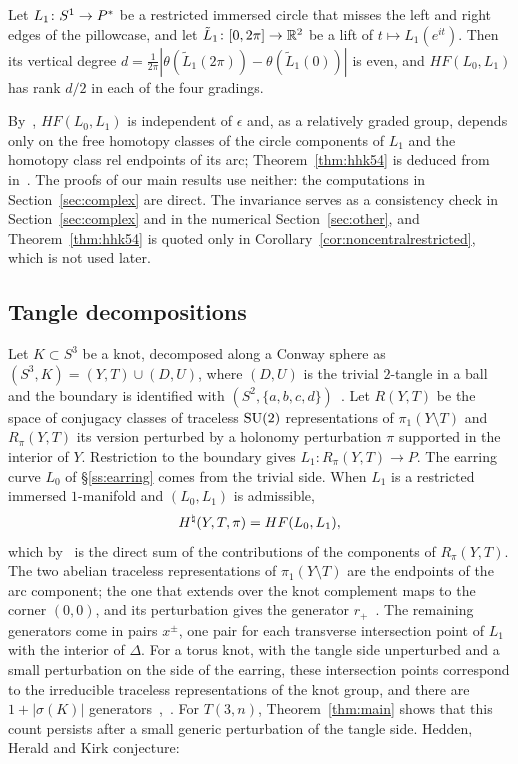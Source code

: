 \begin{theorem}\label{thm:hhk54}
Let $L_1\colon S^1\to P^{*}$ be a restricted immersed circle that misses the left and right edges of the
pillowcase, and let $\tilde L_1\colon[0,2\pi]\to\mathbb{R}^2$ be a lift of $t\mapsto L_1(e^{it})$. Then its vertical degree
$d=\frac1{2\pi}|\theta(\tilde L_1(2\pi))-\theta(\tilde L_1(0))|$ is even, and $HF(L_0,L_1)$ has rank $d/2$ in each of
the four gradings.
\end{theorem}

\begin{remark}\label{rem:invariance}
By~\cite[Thm.~4.1, Cor.~4.6]{HHK2}, $HF(L_0,L_1)$ is independent of $\epsilon$ and, as a relatively graded group,
depends only on the free homotopy classes of the circle components of $L_1$ and the homotopy class rel
endpoints of its arc; Theorem~\ref{thm:hhk54} is deduced from~\cite[Cor.~4.6]{HHK2} in~\cite[p.~33]{HHK2}. The proofs of
our main results use neither: the computations in Section~\ref{sec:complex} are direct. The invariance serves as a
consistency check in Section~\ref{sec:complex} and in the numerical Section~\ref{sec:other}, and
Theorem~\ref{thm:hhk54} is quoted only in Corollary~\ref{cor:noncentralrestricted}, which is not used later.
\end{remark}

\subsection{Tangle decompositions}\label{ss:decomp}
Let $K\subset S^3$ be a knot, decomposed along a Conway sphere as $(S^3,K)=(Y,T)\cup(D,U)$, where $(D,U)$ is
the trivial $2$-tangle in a ball and the boundary is identified with $(S^2,\{a,b,c,d\})$~\cite[(17)]{HHK2}.
Let $R(Y,T)$ be the space of conjugacy classes of traceless $\mathrm{SU}(2)$ representations of $\pi_1(Y\setminus T)$
and $R_\pi(Y,T)$ its version perturbed by a holonomy perturbation $\pi$ supported in the interior of $Y$.
Restriction to the boundary gives $L_1\colon R_\pi(Y,T)\to P$. The earring curve $L_0$ of \S\ref{ss:earring}
comes from the trivial side. When $L_1$ is a restricted immersed $1$-manifold and $(L_0,L_1)$ is admissible,
\[
H^{\natural}(Y,T,\pi)=HF(L_0,L_1),
\]
which by~\cite[p.~34, \S6.1]{HHK2} is the direct sum of the contributions of the components of
$R_\pi(Y,T)$. The two abelian traceless representations of $\pi_1(Y\setminus T)$ are the endpoints of the
arc component; the one that extends over the knot complement maps to the corner $(0,0)$, and its
perturbation gives the generator $r_+$~\cite[\S6.1, \S8]{HHK2}. The remaining generators come in pairs $x^\pm$,
one pair for each transverse intersection point of $L_1$ with the interior of $\Delta$. For a torus knot,
with the tangle side unperturbed and a small perturbation on the side of the earring, these intersection
points correspond to the irreducible traceless representations of the knot group, and there are
$1+|\sigma(K)|$ generators~\cite[Thm.~11.1]{HHK1},~\cite[\S11.10]{HHK2}. For $T(3,n)$, Theorem~\ref{thm:main}
shows that this count persists after a small generic perturbation of the tangle side.
Hedden, Herald and Kirk conjecture:

